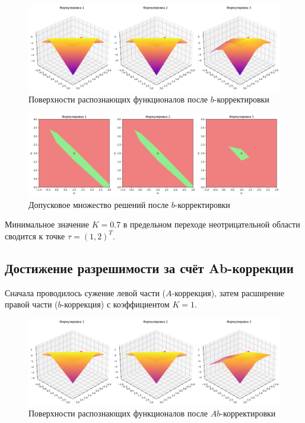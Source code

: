 \documentclass{article}
\begin{document}
  \begin{figure}[htbp!]
		\begin{center}
			\includegraphics[width = \textwidth]{tol_b_corrected}
			\caption{Поверхности распознающих функционалов после
        \( b \)-корректировки}
      \label{figure:tol_b_corrected}
		\end{center}
	\end{figure}

  \begin{figure}[htbp!]
		\begin{center}
			\includegraphics[width = \textwidth]{tol_functional_b_corrected}
			\caption{Допусковое множество решений после \( b \)-корректировки}
      \label{figure:tol_functional_b_corrected}
		\end{center}
	\end{figure}

  Минимальное значение \( K = 0.7 \) в предельном переходе неотрицательной
  области сводится к точке \( \tau = (1, 2)^T \).

  \subsection{Достижение разрешимости за счёт Ab-коррекции}

  Сначала проводилось сужение левой части (\( A \)-коррекция), затем
  расширение правой части (\( b \)-коррекция) с коэффициентом \( K = 1 \).

  \begin{figure}[htbp!]
		\begin{center}
			\includegraphics[width = \textwidth]{tol_ab_corrected}
			\caption{Поверхности распознающих функционалов после
        \( Ab \)-корректировки}
      \label{figure:tol_ab_corrected}
		\end{center}
	\end{figure}
\end{document}
